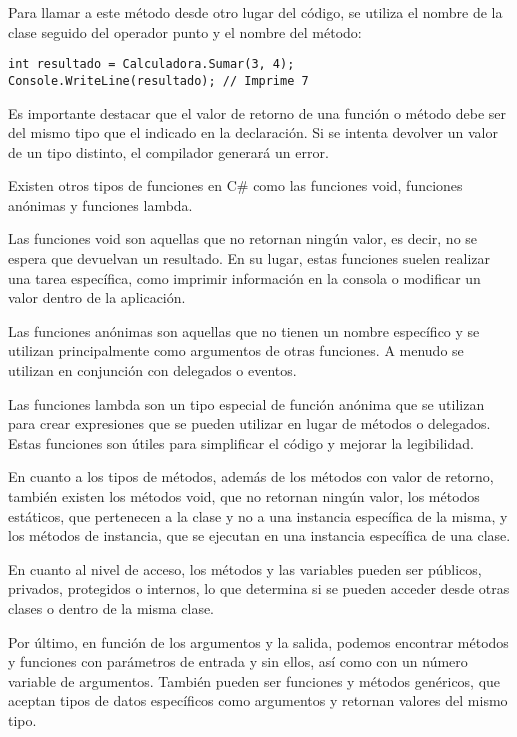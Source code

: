 \documentclass[executivepaper]{article}
\begin{document}
Para llamar a este método desde otro lugar del código, se utiliza el nombre de la clase seguido del operador punto y el nombre del método:

\begin{lstlisting}[language={[Sharp]C}]
int resultado = Calculadora.Sumar(3, 4);
Console.WriteLine(resultado); // Imprime 7
\end{lstlisting}

Es importante destacar que el valor de retorno de una función o método debe ser del mismo tipo que el indicado en la declaración. Si se intenta devolver un valor de un tipo distinto, el compilador generará un error.

Existen otros tipos de funciones en C\# como las funciones void, funciones anónimas y funciones lambda.

Las funciones void son aquellas que no retornan ningún valor, es decir, no se espera que devuelvan un resultado. En su lugar, estas funciones suelen realizar una tarea específica, como imprimir información en la consola o modificar un valor dentro de la aplicación.

Las funciones anónimas son aquellas que no tienen un nombre específico y se utilizan principalmente como argumentos de otras funciones. A menudo se utilizan en conjunción con delegados o eventos.

Las funciones lambda son un tipo especial de función anónima que se utilizan para crear expresiones que se pueden utilizar en lugar de métodos o delegados. Estas funciones son útiles para simplificar el código y mejorar la legibilidad.

En cuanto a los tipos de métodos, además de los métodos con valor de retorno, también existen los métodos void, que no retornan ningún valor, los métodos estáticos, que pertenecen a la clase y no a una instancia específica de la misma, y los métodos de instancia, que se ejecutan en una instancia específica de una clase.

En cuanto al nivel de acceso, los métodos y las variables pueden ser públicos, privados, protegidos o internos, lo que determina si se pueden acceder desde otras clases o dentro de la misma clase.

Por último, en función de los argumentos y la salida, podemos encontrar métodos y funciones con parámetros de entrada y sin ellos, así como con un número variable de argumentos. También pueden ser funciones y métodos genéricos, que aceptan tipos de datos específicos como argumentos y retornan valores del mismo tipo.
\end{document}
